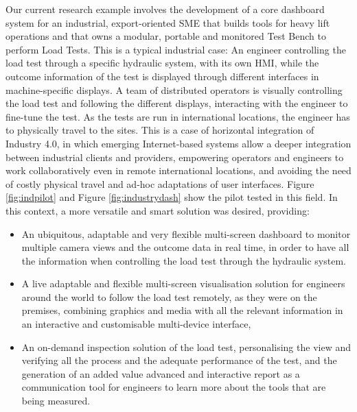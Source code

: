 Our current research example involves the development of a core dashboard system for an industrial, export-oriented SME that builds tools for heavy lift operations and that owns a modular,
portable and monitored Test Bench to perform Load Tests. This is a typical industrial case: An engineer controlling the load test through a specific hydraulic system, with its own HMI, while the outcome information of the test is displayed through different interfaces in machine-specific displays. A team of distributed operators is visually controlling the load test and following the different displays, interacting with the engineer to fine-tune the test. As the tests are run in international locations, the engineer has to physically travel to the sites.
This is a case of horizontal integration of Industry 4.0, in which emerging Internet-based systems allow a deeper integration between industrial clients and providers, empowering operators and engineers to work collaboratively even in remote international locations, and avoiding the need of costly physical travel and ad-hoc adaptations of user interfaces. Figure \ref{fig:indpilot} and Figure \ref{fig:industrydash} show the pilot tested in this field. In this context, a more versatile and smart solution was desired, providing:
\begin{itemize}
	\item An ubiquitous, adaptable and very flexible multi-screen dashboard to monitor multiple camera views and the outcome data in real time, in order to have all the information when controlling the load test through the hydraulic system.
	\item A live adaptable and flexible multi-screen visualisation solution for engineers around the world to follow the load test remotely, as they were on the premises, combining graphics and media with all the relevant information in an interactive and customisable multi-device interface,
	\item An on-demand inspection solution of the load test, personalising the view and verifying all the process and the adequate performance of the test, and the generation of an added value advanced and interactive report as a communication tool for engineers to learn more about the tools that are being measured. 
\end{itemize}


